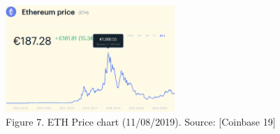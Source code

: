 \documentclass[12pt]{amsart}
\begin{document}
\begin{multicols}{2}
\begin{center}
  \includegraphics[keepaspectratio, width=0.481125\textwidth]{images/ethcurrentprice-sourcecoinbase.eps}
\\
Figure 7. ETH Price chart (11/08/2019). Source: [Coinbase 19]
\\
\end{center}



\end{multicols}
\end{document}
